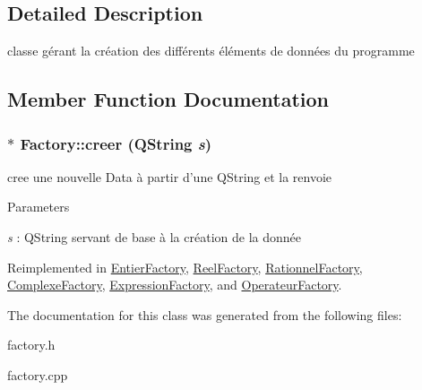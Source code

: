 \subsection{Detailed Description}
classe gérant la création des différents éléments de données du programme 

\subsection{Member Function Documentation}
\hypertarget{classFactory_afe37851e80172944b37491a952a28370}{
\subsubsection[{creer}]{ $\ast$ Factory::creer (QString {\em s})}}
\label{classFactory_afe37851e80172944b37491a952a28370}


cree une nouvelle Data à partir d'une QString et la renvoie 


\begin{DoxyParams}{Parameters}
\item[{\em s}]: QString servant de base à la création de la donnée \end{DoxyParams}


Reimplemented in \hyperlink{classEntierFactory_a17b1d9b2f18be4ad886f23cecd0ecb7c}{EntierFactory}, \hyperlink{classReelFactory_a09c1138eecb34e7ed2664b335ba6aa13}{ReelFactory}, \hyperlink{classRationnelFactory_aefce747781195682e508436186875fca}{RationnelFactory}, \hyperlink{classComplexeFactory_a751c417a005259673accfc2a60fd62fd}{ComplexeFactory}, \hyperlink{classExpressionFactory_a4df557fb77406bbfc1dc28a0fb830204}{ExpressionFactory}, and \hyperlink{classOperateurFactory_a0b817d63174f2c7c86020f3d9eebf7ce}{OperateurFactory}.



The documentation for this class was generated from the following files:\begin{DoxyCompactItemize}
\item 
factory.h\item 
factory.cpp\end{DoxyCompactItemize}
